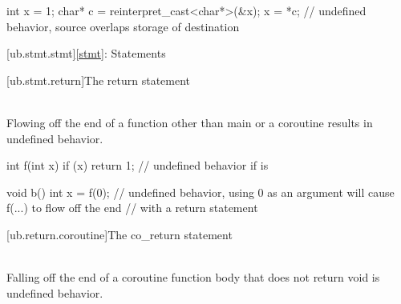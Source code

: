 \pnum
\begin{example}
\begin{codeblock}
int x = 1;
char* c = reinterpret_cast<char*>(&x);
x = *c;         // undefined behavior, source overlaps storage of destination
\end{codeblock}
\end{example}

[ub.stmt.stmt]{\ref{stmt}: Statements}

[ub.stmt.return]{The return statement}

\pnum
{} \\
Flowing off the end of a function other
than main or a coroutine results in undefined behavior.

\pnum
\begin{example}
\begin{codeblock}
int f(int x) {
  if (x)
    return 1;
  // undefined behavior if  is 
}

void b() {
  int x = f(0); // undefined behavior, using 0 as an argument will cause f(...) to flow off the end
                // with a return statement
}
\end{codeblock}
\end{example}

[ub.return.coroutine]{The co_return statement}

\pnum
{} \\
Falling off the end of a coroutine function body that does not return void is undefined behavior.

